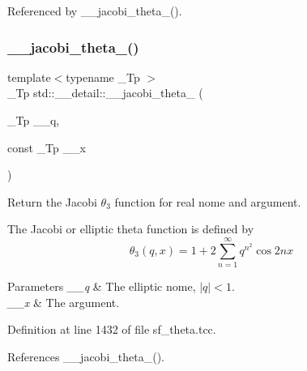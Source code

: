Referenced by \+\_\+\+\_\+jacobi\+\_\+theta\+\_().

\mbox{\label{namespacestd_1_1____detail_a6a7102085368188062ef47100ce80239}} 
\subsubsection{\texorpdfstring{\+\_\+\+\_\+jacobi\+\_\+theta\+\_()}{\_\_jacobi\_theta\_3()}\hspace{0.1cm}{\footnotesize\ttfamily [2/2]}}
{\footnotesize\ttfamily template$<$typename \+\_\+\+Tp $>$ \\
\+\_\+\+Tp std\+::\+\_\+\+\_\+detail\+::\+\_\+\+\_\+jacobi\+\_\+theta\+\_ (\begin{DoxyParamCaption}\item[{\+\_\+\+Tp}]{\+\_\+\+\_\+q,  }\item[{const \+\_\+\+Tp}]{\+\_\+\+\_\+x }\end{DoxyParamCaption})}

Return the Jacobi $ \theta_3 $ function for real nome and argument.

The Jacobi or elliptic theta function is defined by \[ \theta_3(q,x) = 1 + 2\sum_{n=1}^{\infty} q^{n^2}\cos{2nx} \]


\begin{DoxyParams}{Parameters}
{\em \+\_\+\+\_\+q} & The elliptic nome, $ |q| < 1 $. \\
\hline
{\em \+\_\+\+\_\+x} & The argument. \\
\hline
\end{DoxyParams}


Definition at line 1432 of file sf\+\_\+theta.\+tcc.



References \+\_\+\+\_\+jacobi\+\_\+theta\+\_().

\mbox{\label{namespacestd_1_1____detail_aef15a9b55f5f4ed8b1f6d6113ad0ef12}} 
